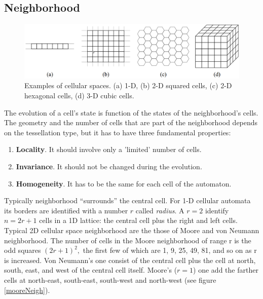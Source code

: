 \subsection{Neighborhood}
\begin{figure}
\centering
\caption{Examples of cellular spaces. (a) 1-D, (b) 2-D squared cells,
(c) 2-D hexagonal cells, (d) 3-D cubic cells.}\label{spazioCellulare}
\includegraphics[scale=0.23]{./images/CA_FDM/spazioCellulare}
\end{figure}
The evolution of a cell's state is function of the states of the neighborhood's
cells. The geometry and the number of cells that are part of the neighborhood
depends on the tessellation type, but it has to have three fundamental
properties:
\begin{enumerate}
  \item \textbf{Locality}. It should involve only a 'limited' number of cells.
  \item \textbf{Invariance}. It should not be changed during the evolution.
  \item \textbf{Homogeneity}. It has to be the same for each cell of the
  automaton.
\end{enumerate}
Typically neighborhood ``surrounds'' the central cell. For 1-D cellular automata
its borders are identified with a number \begin{math}r \end{math} called
\textit{radius}\cite{wolfram1983}. A \begin{math}r=2\end{math} identify
\begin{math}n=2r+1\end{math} cells in a 1D lattice: the central cell plus the
right and left cells. Typical 2D cellular space neighborhood are the those of
Moore and von Neumann neighborhood. The number of cells in the Moore
neighborhood of range r is the odd squares \begin{math}(2r+1)^2,\end{math} the
first few of which are 1, 9, 25, 49, 81, and so on as r is increased.
Von Neumann's one consist of the central cell plus the cell at north, south,
east, and west of the central cell itself. Moore's (\begin{math}r=1\end{math})
one add  the farther cells at north-east, south-east, south-west and north-west
(see figure \ref{mooreNeigh}).



